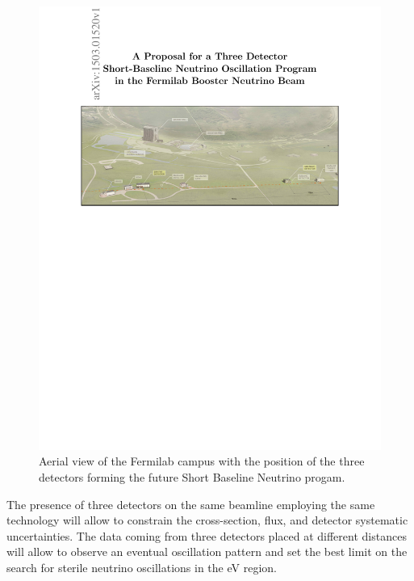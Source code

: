 \begin{figure}[htbp]
    \centering
    \includegraphics[width=0.9\linewidth]{figures/sbn_aerial.pdf}
    \caption{Aerial view of the Fermilab campus with the position of the three detectors forming the future Short Baseline Neutrino progam.}
    \label{fig:sbn_aerial}
\end{figure}

The presence of three detectors on the same beamline employing the same technology will allow to constrain the cross-section, flux, and detector systematic uncertainties. The data coming from three detectors placed at different distances will allow to observe an eventual oscillation pattern and set the best limit on the search for sterile neutrino oscillations in the eV region. 